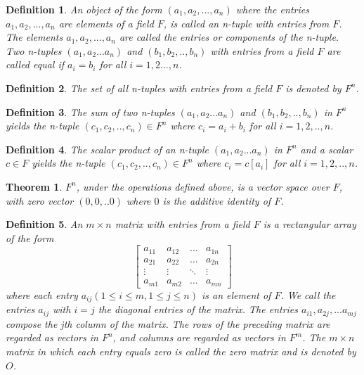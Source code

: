 \documentclass[a4paper]{article}
\newtheorem{mytheorem}{Theorem}
\newtheorem{mydef}{Definition}
\numberwithin{mytheorem}{section}
\numberwithin{mydef}{section}
\numberwithin{example}{section}
\begin{document}
\begin{mydef} An object of the form $(a_{1},a_{2},...,a_{n})$ where the entries $a_{1},a_{2},...,a_{n}$ are elements of a field $F$, is called an n-tuple with entries from $F$. The elements $a_{1},a_{2},...,a_{n}$  are called the entries or components of the n-tuple. Two n-tuples $(a_{1},a_{2}...a_{n})$ and $(b_{1},b_{2},..,b_{n})$ with entries from a field $F$ are called equal if $a_{i} = b_{i}$ for all $i = 1,2...,n$. 
\end{mydef}

\begin{mydef} The set of all n-tuples with entries from a field $F$ is denoted by $F^{n}$.
\end{mydef}

\begin{mydef} The sum of two n-tuples $(a_{1},a_{2}...a_{n})$ and $(b_{1},b_{2},..,b_{n})$ in $F^{n}$ yields the n-tuple $(c_{1},c_{2},..,c_{n}) \in F^{n}$ where $c_{i} = a_{i}+b_{i}$ for all $i = 1,2,..,n$.  
\end{mydef}

\begin{mydef} The scalar product of an n-tuple $(a_{1},a_{2}...a_{n})$ in $F^{n}$ and a scalar $c \in F$ yields the n-tuple $(c_{1},c_{2},..,c_{n}) \in F^{n}$ where $c_{i} = c[a_{i}] $ for all $i = 1,2,..,n$.  
\end{mydef}

\begin{mytheorem} $F^{n}$, under the operations defined above, is a vector space over $F$, with zero vector $(0,0,..0)$ where $0$ is the additive identity of $F$. \end{mytheorem}

\begin{mydef} An $m \times n$ matrix with entries from a field $F$ is a rectangular array of the form 
\[
\begin{bmatrix}
    a_{11}       & a_{12}  & \dots & a_{1n} \\
    a_{21}       & a_{22} & \dots & a_{2n} \\
    \vdots & \vdots & \ddots & \vdots \\
    a_{m1}       & a_{m2} & \dots & a_{mn}
\end{bmatrix}
\] 
where each entry $a_{ij} (1 \leq i \leq m, 1 \leq j \leq n)$ is an element of $F$. We  call the entries $a_{ij}$ with $i = j$ the diagonal entries of the matrix. The entries $a_{i1},a_{2j},...a_{mj}$ compose the jth column of the matrix. The rows of the preceding matrix are regarded as vectors in $F^{n}$, and columns are regarded as vectors in $F^{m}$. The $m \times n$ matrix in which each entry equals zero is called the zero matrix and is denoted by $O$. 
\end{mydef}
\end{document}
